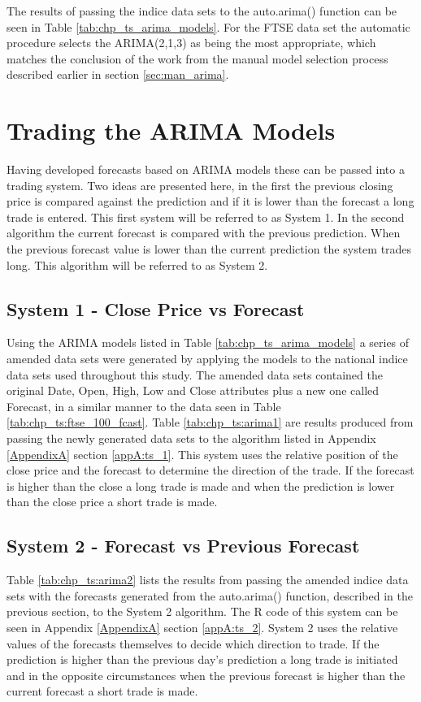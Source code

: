 The results of passing the indice data sets to the auto.arima() function can be seen in Table \ref{tab:chp_ts_arima_models}. For the FTSE data set the automatic procedure selects the ARIMA(2,1,3) as being the most appropriate, which matches the conclusion of the work from the manual model selection process described earlier in section \ref{sec:man_arima}.



\section{Trading the ARIMA Models}
Having developed forecasts based on ARIMA models these can be passed into a trading system. Two ideas are presented here, in the first the previous closing price is compared against the prediction and if it is lower than the forecast a long trade is entered. This first system will be referred to as System 1. In the second algorithm the current forecast is compared with the previous prediction. When the previous forecast value is lower than the current prediction the system trades long. This algorithm will be referred to as System 2.

\subsection{System 1 - Close Price vs Forecast}
Using the ARIMA models listed in Table \ref{tab:chp_ts_arima_models} a series of amended data sets were generated by applying the models to the national indice data sets used throughout this study. The amended data sets contained the original Date, Open, High, Low and Close attributes plus a new one called Forecast, in a similar manner to the data seen in Table  \ref{tab:chp_ts:ftse_100_fcast}. Table \ref{tab:chp_ts:arima1} are results produced from passing the newly generated data sets to the algorithm listed in Appendix \ref{AppendixA} section \ref{appA:ts_1}. This system uses the relative position of the close price and the forecast to determine the direction of the trade. If the forecast is higher than the close a long trade is made and when the prediction is lower than the close price a short trade is made.



\subsection{System 2 - Forecast vs Previous Forecast}
Table \ref{tab:chp_ts:arima2} lists the results from passing the amended indice data sets with the forecasts generated from the auto.arima() function, described in the previous section, to the System 2 algorithm. The R code of this system can be seen in  Appendix \ref{AppendixA} section \ref{appA:ts_2}. System 2 uses the relative values of the forecasts themselves to decide which direction to trade. If the prediction is higher than the previous day's prediction a long trade is initiated and in the opposite circumstances when the previous forecast is higher than the current forecast a short trade is made.

